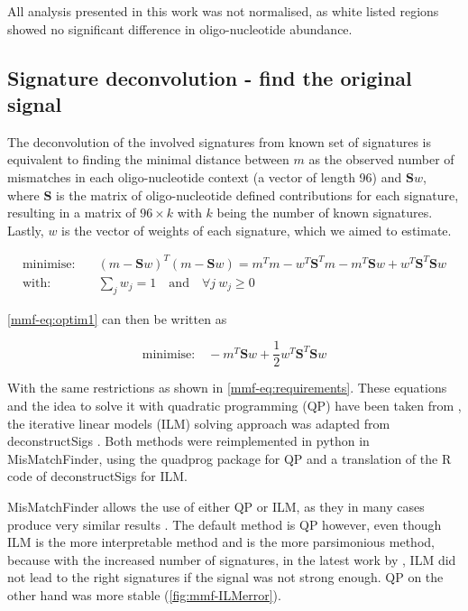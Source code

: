 All analysis presented in this work was not normalised, as white listed regions showed no significant difference in oligo-nucleotide abundance.

\subsection[Signature deconvolution]{Signature deconvolution - find the original signal}
\label{mmf-sec:sigDeconv}
The deconvolution of the involved signatures from known set of signatures is equivalent to finding the minimal distance between $m$ as the observed number of mismatches in each oligo-nucleotide context (a vector of length 96) and $\textbf{S}w$, where $\textbf{S}$ is the matrix of oligo-nucleotide defined contributions for each signature, resulting in a matrix of $96 \times k$ with $k$ being the number of known signatures. Lastly, $w$ is the vector of weights of each signature, which we aimed to estimate. 

\begin{align}
 \text{minimise:} & \quad (m - \textbf{S}w)^T(m - \textbf{S}w)
 = m^Tm - w^T\textbf{S}^Tm - m^T\textbf{S}w + w^T\textbf{S}^T\textbf{S}w \label{mmf-eq:optim1}\\
 \text{with:} & \quad \sum_j w_j = 1 \quad \text{and} \quad \boldsymbol{\forall} j ~ w_j \geq 0 \label{mmf-eq:requirements}
\end{align}
\myequation[\ref{mmf-eq:optim1}]{MisMatchFinder: optimisation for signature weights}
\myequation[\ref{mmf-eq:requirements}]{MisMatchFinder: optimisation function restrictions}

\autoref{mmf-eq:optim1} can then be written as 

\begin{equation}
\text{minimise:} \quad - m^T\textbf{S}w + \frac{1}{2}w^T\textbf{S}^T\textbf{S}w
\label{mmf-eq:optim2}
\end{equation}
\myequation[\ref{mmf-eq:optim2}]{MisMatchFinder: quadratic programming formula}

With the same restrictions as shown in \autoref{mmf-eq:requirements}. These equations and the idea to solve it with quadratic programming (QP) have been taken from \textcite{Lynch2016}, the iterative linear models (ILM) solving approach was adapted from deconstructSigs \cite{Rosenthal2016}. Both methods were reimplemented in python in MisMatchFinder, using the quadprog package \cite{McGibbon2021} for QP and a translation of the R code of deconstructSigs for ILM.

MisMatchFinder allows the use of either QP or ILM, as they in many cases produce very similar results \cite{Lynch2016}. The default method is QP however, even though ILM is the more interpretable method and is the more parsimonious method, because with the increased number of signatures, in the latest work by \textcite{Alexandrov2020}, ILM did not lead to the right signatures if the signal was not strong enough. QP on the other hand was more  stable (\autoref{fig:mmf-ILMerror}).

